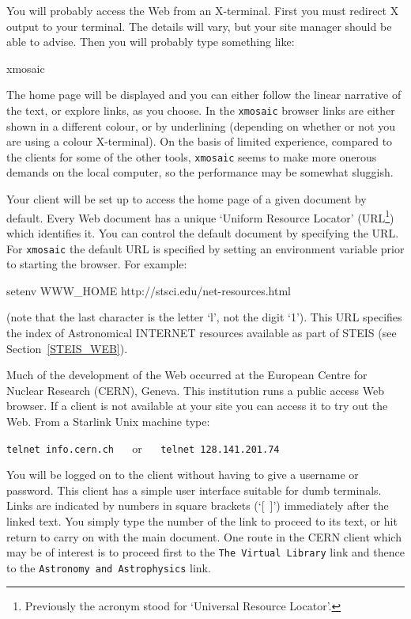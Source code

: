 \documentclass[twoside,11pt,nolof]{starlink}
\begin{document}
You will probably access the Web from an X-terminal. First you must
redirect X output to your terminal. The details will vary, but your site
manager should be able to advise. Then you will probably type something
like:

\begin{terminalv}
xmosaic
\end{terminalv}

The home page will be displayed and you can either follow the linear
narrative of the text, or explore links, as you choose. In the \texttt{xmosaic} browser links are either shown in a different colour, or by
underlining (depending on whether or not you are using a colour
X-terminal). On the basis of limited experience, compared to the clients
for some of the other tools, \texttt{xmosaic} seems to make more onerous
demands on the local computer, so the performance may be somewhat
sluggish.

Your client will be set up to access the home page of a given document
by default. Every Web document has a unique `Uniform Resource Locator'
(URL\footnote{Previously the acronym stood for `Universal Resource
Locator'.}) which identifies it. You can control the default document
by specifying the URL. For \texttt{xmosaic} the default URL is specified
by setting an environment variable prior to starting the browser. For
example:

\begin{terminalv}
setenv  WWW_HOME  http://stsci.edu/net-resources.html
\end{terminalv}

(note that the last character is the letter `l', not the digit `1').
This URL specifies the index of Astronomical INTERNET resources
available as part of STEIS (see Section~\ref{STEIS_WEB}).

Much of the development of the Web occurred at the European Centre for
Nuclear Research (CERN), Geneva. This institution runs a public access
Web browser. If a client is not available at your site you can access it
to try out the Web. From a Starlink Unix machine type:

\vspace{2.0 mm}
\verb:telnet info.cern.ch: ~~ or ~~ \verb:telnet 128.141.201.74:
\vspace{2.0 mm}

You will be logged on to the client without having to give a username
or password. This client has a simple user interface suitable for
dumb terminals. Links are indicated by numbers in square brackets
(`[~]') immediately after the linked text. You simply type the number
of the link to proceed to its text, or hit return to carry on with the
main document. One route in the CERN client which may be of interest is
to proceed first to the \texttt{The Virtual Library} link and
thence to the \texttt{Astronomy and Astrophysics} link.
\end{document}
